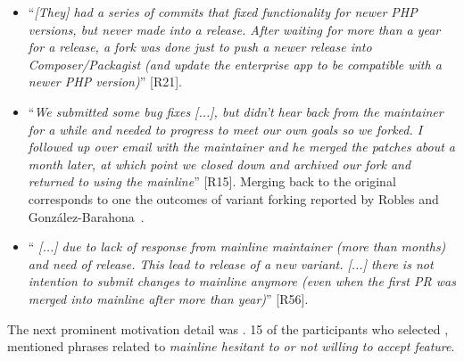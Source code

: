 \begin{itemize}[leftmargin=*]
\item ``\emph{[They] %
had a series of commits that fixed functionality for newer PHP versions, but never made into a release. %
After waiting for more than a year for a release, a fork was done just to push a newer release into Composer/Packagist (and update the enterprise app to be compatible with a newer PHP version)}'' [R21].

\item ``\emph{We submitted some bug fixes [...], %
but didn't hear back from the maintainer for a while and needed to progress to meet our own goals so we forked. I followed up over email with the maintainer and he merged the patches about a month later, at which point we closed down and archived our fork and returned to using the mainline}'' [R15].
Merging back to the original corresponds to one the outcomes of variant forking reported by Robles and Gonz{\'a}lez-Barahona~\cite{Gregorio:2012}.

\item ``\emph{%
[...] due to lack of response from mainline maintainer (more than months) and need of release. This lead to release of a new variant. [...] there is not intention to submit changes to mainline anymore (even when the first PR was merged into mainline after more than year)}'' [R56].
\end{itemize}

\nd The next prominent  motivation detail was .
15 of the participants who selected , mentioned phrases related to \emph{mainline hesitant to or not willing to accept feature}.

